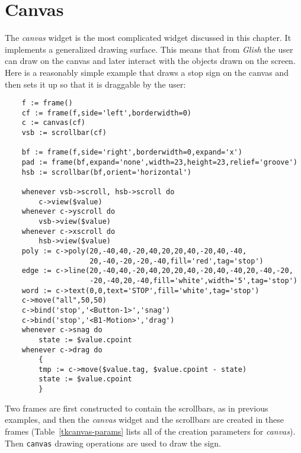 \section{Canvas}
The {\em canvas} widget is the most complicated widget discussed in this chapter.
It implements a generalized drawing surface. This means that from {\em
Glish} the user can draw on the canvas and later interact with the
objects drawn on the screen.
Here is a reasonably simple example that draws a stop sign on the canvas and then
sets it up so that it is draggable by the user:
\begin{verbatim}
    f := frame()
    cf := frame(f,side='left',borderwidth=0)
    c := canvas(cf)
    vsb := scrollbar(cf)

    bf := frame(f,side='right',borderwidth=0,expand='x')
    pad := frame(bf,expand='none',width=23,height=23,relief='groove')
    hsb := scrollbar(bf,orient='horizontal')

    whenever vsb->scroll, hsb->scroll do
        c->view($value)
    whenever c->yscroll do
        vsb->view($value)
    whenever c->xscroll do
        hsb->view($value)
    poly := c->poly(20,-40,40,-20,40,20,20,40,-20,40,-40,
                    20,-40,-20,-20,-40,fill='red',tag='stop')
    edge := c->line(20,-40,40,-20,40,20,20,40,-20,40,-40,20,-40,-20,
                    -20,-40,20,-40,fill='white',width='5',tag='stop')
    word := c->text(0,0,text='STOP',fill='white',tag='stop')
    c->move("all",50,50)
    c->bind('stop','<Button-1>','snag')
    c->bind('stop','<B1-Motion>','drag')
    whenever c->snag do
        state := $value.cpoint
    whenever c->drag do
        {
        tmp := c->move($value.tag, $value.cpoint - state)
        state := $value.cpoint
        }
\end{verbatim}
Two frames are first constructed to contain the scrollbars, as
in previous examples, and then the {\em canvas} widget and the 
scrollbars are created
in these frames (Table~\ref{tkcanvas-params} lists all of the creation parameters
for {\em canvas}). Then {\tt canvas} drawing operations are used to draw the
sign.

